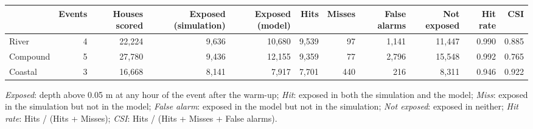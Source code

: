 \begin{tabular}{lrrrrrrrrrr}
\toprule
 & Events & Houses scored & Exposed (simulation) & Exposed (model) & Hits & Misses & False alarms & Not exposed & Hit rate & CSI \\
\midrule
River & 4 & 22,224 & 9,636 & 10,680 & 9,539 & 97 & 1,141 & 11,447 & 0.990 & 0.885 \\
Compound & 5 & 27,780 & 9,436 & 12,155 & 9,359 & 77 & 2,796 & 15,548 & 0.992 & 0.765 \\
Coastal & 3 & 16,668 & 8,141 & 7,917 & 7,701 & 440 & 216 & 8,311 & 0.946 & 0.922 \\
\bottomrule
\end{tabular}
\par\smallskip
{\footnotesize \textit{Exposed}: depth above 0.05 m at any hour of the event after the warm-up; \textit{Hit}: exposed in both the simulation and the model; \textit{Miss}: exposed in the simulation but not in the model; \textit{False alarm}: exposed in the model but not in the simulation; \textit{Not exposed}: exposed in neither; \textit{Hit rate}: Hits / (Hits + Misses); \textit{CSI}: Hits / (Hits + Misses + False alarms).}
